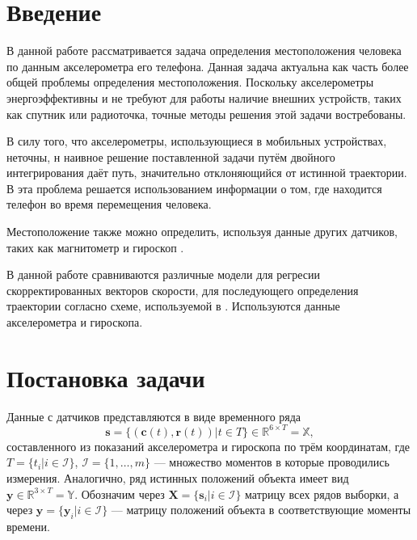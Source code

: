 \documentclass[12pt,twoside]{article}
\title
    {Определение местоположения по сигналам акселерометра}
\author
    {Макаров~М.\,В.} %
\begin{document}
\maketitle

\section{Введение}
В данной работе рассматривается задача определения местоположения человека по данным акселерометра его телефона. Данная задача актуальна как часть
более общей проблемы определения местоположения. Поскольку акселерометры энергоэффективны и не требуют для работы наличие внешних устройств, таких как спутник или радиоточка, точные методы решения этой задачи востребованы.
    
В силу того, что акселерометры, использующиеся в мобильных устройствах, неточны, н
наивное решение поставленной задачи путём двойного интегрирования даёт путь, значительно отклоняющийся от истинной траектории.
В \cite{journals/corr/abs-1712-09004} эта проблема решается использованием информации о том, где находится телефон во время 
перемещения человека.

Местоположение также можно определить, используя данные других датчиков, таких как магнитометр \cite{6987239} и гироскоп \cite{s18051391}.

В данной работе сравниваются различные модели для регресии скорректированных векторов скорости, для последующего определения траектории согласно схеме, используемой в \cite{journals/corr/abs-1712-09004}. Используются данные акселерометра и гироскопа.


\section{Постановка задачи}
Данные с датчиков представляются в виде временного ряда 
\[
\mathbf{s} = \{ (\mathbf{c}(t), \mathbf{r}(t)) | t \in T \} \in {\mathbb{R}^{6 \times T}} = \mathbb{X}, \label{eq:s} \tag{*}
\]
составленного из показаний акселерометра и гироскопа по трём координатам, 
где 
$T = \{ t_i | i \in \mathcal{I} \}$, $\mathcal{I} = \{1, \ldots, m\}$ --- множество моментов в которые проводились измерения. 
Аналогично, ряд истинных положений объекта имеет вид $\mathbf{y} \in {\mathbb{R}^{3 \times T}} = \mathbb{Y}$.
Обозначим через $\mathbf{X} = \{ \mathbf{s}_i | i \in \mathcal{I} \} $ матрицу всех рядов выборки, 
а через $\mathbf{y} = \{ \mathbf{y}_i | i \in \mathcal{I} \}$ --- матрицу положений объекта в соответствующие моменты времени.
\end{document}
